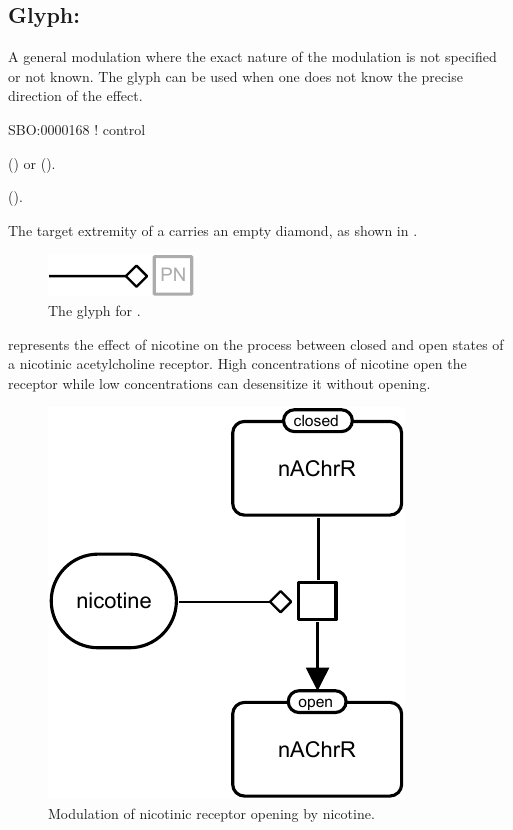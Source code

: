 \subsection{Glyph: }
\label{sec:modulation}


A general modulation where the exact nature of the modulation is not specified or not known.
The  glyph can be used when one does not know the precise direction of the effect.

\begin{glyphDescription}

\glyphSboTerm
SBO:0000168 ! control

\glyphOrigin
{}  () or   ().

\glyphTarget
{}  ().

\glyphSymbol
The target extremity of a  carries an empty diamond, as shown in .

\end{glyphDescription}

\begin{figure}[H]
  \centering
  \includegraphics{images/modulation}
  \caption{The \PD glyph for .}
  \label{fig:modulation}
\end{figure}

 represents the effect of nicotine on the process between closed and open states of a nicotinic acetylcholine receptor. High concentrations of nicotine open the receptor while low concentrations can desensitize it without opening.

\begin{figure}[H]
  \centering
  \includegraphics[scale = 0.8]{examples/modulation-nAChR}
  \caption{Modulation of nicotinic receptor opening by nicotine.}
  \label{fig:modul-nico}
\end{figure}
